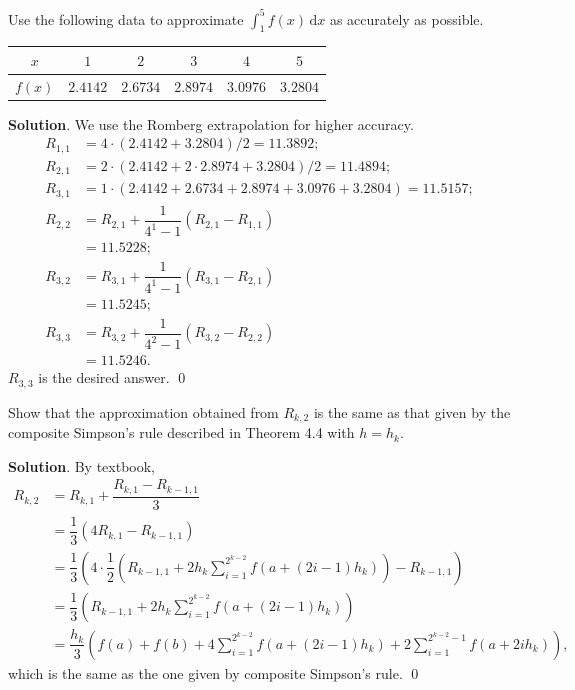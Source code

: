 \documentclass[11pt]{article}
\theoremstyle{break}
\newcommand{\ddi}{\text{$\,$d}}
\numberwithin{equation}{theorem}
\begin{document}
\newpage
\begin{problem}\label{problem 11} %
    Use the following data to approximate $\displaystyle\int_1^5 f(x)\ddi x$ as accurately as possible.
    \begin{center}
        \begin{tabular}{c|c|c|c|c|c}
            $x$ & $1$ & $2$ & $3$ & $4$ & $5$ \\
            \hline
            $f(x)$ & $2.4142$ & $2.6734$ & $2.8974$ & $3.0976$ & $3.2804$
        \end{tabular}
    \end{center}
\end{problem}
\textbf{Solution}. We use the Romberg extrapolation for higher accuracy. \begin{align*}
    R_{1,1}&=4\cdot\left(2.4142+3.2804\right)/2=11.3892;\\
    R_{2,1}&=2\cdot\left(2.4142+2\cdot2.8974+3.2804\right)/2=11.4894;\\
    R_{3,1}&=1\cdot\left(2.4142+2.6734+2.8974+3.0976+3.2804\right)=11.5157;\\
    R_{2,2}&=R_{2,1}+\dfrac{1}{4^1-1}\left(R_{2,1}-R_{1,1}\right)\\
    &=11.5228;\\
    R_{3,2}&=R_{3,1}+\dfrac{1}{4^1-1}\left(R_{3,1}-R_{2,1}\right)\\
    &=11.5245;\\
    R_{3,3}&=R_{3,2}+\dfrac{1}{4^2-1}\left(R_{3,2}-R_{2,2}\right)\\
    &=11.5246.
\end{align*}
$R_{3,3}$ is the desired answer. \qed


\newpage
\begin{problem}\label{problem 12} %
    Show that the approximation obtained from $R_{k,2}$ is the same as that given by the composite Simpson's rule described in Theorem 4.4 with $h=h_k$.
\end{problem}
\textbf{Solution}. By textbook,
\begin{align*}
    R_{k, 2} &= R_{k, 1} + \dfrac{R_{k, 1} - R_{k-1, 1}}{3}\\
    &= \dfrac{1}{3}(4R_{k, 1} - R_{k-1, 1})\\
    &= \dfrac{1}{3}\left(4\cdot \dfrac{1}{2}\left(R_{k-1, 1} + 2h_k\displaystyle\sum_{i=1}^{2^{k-2}} f(a+(2i-1)h_k)\right) - R_{k-1, 1}\right)\\
    &= \dfrac{1}{3}\left(R_{k-1, 1} + 2h_k\displaystyle\sum_{i=1}^{2^{k-2}} f(a+(2i-1)h_k)\right)\\
    &= \dfrac{h_k}{3}\left(f(a) + f(b) + 4\displaystyle\sum_{i=1}^{2^{k-2}} f(a+(2i-1)h_k) + 2\displaystyle\sum_{i=1}^{2^{k-2}-1} f(a+2ih_k)\right),
\end{align*}
which is the same as the one given by composite Simpson's rule. \qed
\end{document}
